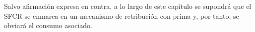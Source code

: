 Salvo afirmación expresa en contra, a lo largo de este capítulo se
supondrá que el SFCR se enmarca en un mecanismo de retribución con
prima y, por tanto, se obviará el consumo asociado.












